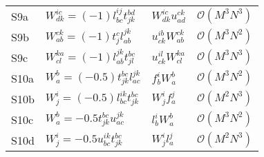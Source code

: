 \begin{center}
\begin{longtable}{@{}llll@{}}
                S9a
                & $W^{ic}_{dk} = (-1) l^{ij}_{bc} t^{bd}_{jk}$
                & $W^{ic}_{dk} u^{ck}_{ad}$
                & $\mathcal{O}(M^3 N^3)$
                \\

                S9b
                & $W^{ck}_{ab} = (-1) t^{c}_{j} l^{jk}_{ab}$
                & $u^{ib}_{ck} W^{ck}_{ab}$
                & $\mathcal{O}(M^3 N^2)$
                \\

                S9c
                & $W^{ka}_{cl} = (-1) l^{jk}_{ab} t^{bc}_{jl}$
                & $u^{il}_{ck} W^{ka}_{cl}$
                & $\mathcal{O}(M^3 N^3)$
                \\

                S10a
                & $W^{b}_{a} = (-0.5) t^{bc}_{jk} l^{jk}_{ac}$
                & $f^{i}_{b} W^{b}_{a}$
                & $\mathcal{O}(M^3 N^2)$
                \\

                S10b
                & $W^{i}_{j} = (-0.5) l^{ik}_{bc} t^{bc}_{jk}$
                & $W^{i}_{j} f^{j}_{a}$
                & $\mathcal{O}(M^2 N^3)$
                \\

                S10c
                & $W^{b}_{a} = -0.5 t^{bc}_{jk} u^{jk}_{ac}$
                & $l^{i}_{b} W^{b}_{a}$
                & $\mathcal{O}(M^3 N^2)$
                \\

                S10d
                & $W^{i}_{j} = -0.5 u^{ik}_{bc} t^{bc}_{jk}$
                & $W^{i}_{j} l^{j}_{a}$
                & $\mathcal{O}(M^2 N^3)$
                \\

            \end{longtable}
        \end{center}

